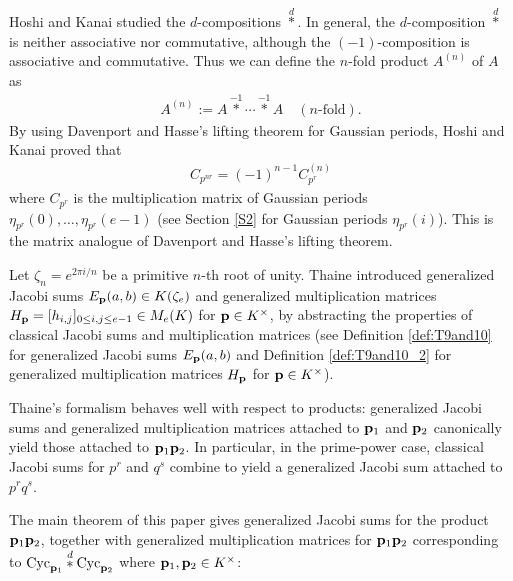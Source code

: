 \documentclass[a4paper, 11pt]{amsart}
\theoremstyle{plain}
\theoremstyle{definition}
\numberwithin{equation}{section}
\begin{document}
Hoshi and Kanai \cite[Section 3]{HK22} studied the $d$-compositions 
$\overset{d}{\ast}$.
In general, the $d$-composition $\overset{d}{\ast}$ 
is neither associative nor commutative, 
although the $(-1)$-composition is associative and commutative. 
Thus we can define the $n$-fold product $A^{(n)}$ of $A$ as 
\begin{align*}
A^{(n)} := A \overset{-1}{\ast} \cdots \overset{-1}{\ast} A\quad(\text{$n$-fold}).
\end{align*}
By using Davenport and Hasse's lifting theorem for Gaussian periods, 
Hoshi and Kanai \cite[Theorem~1.3 and Theorem~1.4]{HK22} proved that
\begin{align} \label{eq:HKmainThm}
C_{p^{nr}} = (-1)^{n-1}C_{p^r}^{(n)}
\end{align}
where $C_{p^r}$ is the multiplication matrix of Gaussian periods $\eta_{p^r}(0),\ldots,\eta_{p^r}(e-1)$ (see Section \ref{S2} for Gaussian periods $\eta_{p^r}(i)$). 
This is the matrix analogue of Davenport and Hasse's lifting theorem.

Let 
$\zeta_n=e^{2\pi i/n}$ be a primitive $n$-th root of unity. 
Thaine \cite{Tha04} introduced generalized Jacobi sums
$E_{{\bf p}}(a,b)\in K(\zeta_e)$
and generalized multiplication matrices $H_{{\bf p}}=[h_{i,j}]_{0\leq i,j \leq e-1}
\in M_e(K)$ for ${\bf p} \in K^{\times}$, 
by abstracting the properties of classical Jacobi sums and multiplication matrices
(see Definition \ref{def:T9and10} for generalized Jacobi sums $E_{{\bf p}}(a,b)$ 
and Definition \ref{def:T9and10_2} for generalized multiplication matrices $H_{{\bf p}}$ for ${\bf p} \in K^{\times}$). 

Thaine's formalism behaves well with respect to products: generalized Jacobi sums and generalized multiplication matrices attached to ${\bf p}_1$ and ${\bf p}_2$ canonically yield those attached to ${\bf p}_1{\bf p}_2$.
In particular, in the prime-power case, classical Jacobi sums for $p^r$ and $q^s$ combine to yield a generalized
Jacobi sum attached to $p^rq^s$.

The main theorem of this paper gives generalized Jacobi sums for the product ${\bf p}_1{\bf p}_2 $, together with generalized multiplication matrices for ${\bf p}_1{\bf p}_2$ corresponding to ${\rm Cyc}_{{\bf p}_1}\overset{d}{\ast}{\rm Cyc}_{{\bf p}_2}$ where ${\bf p}_1, {\bf p}_2 \in K^\times$:
\end{document}
